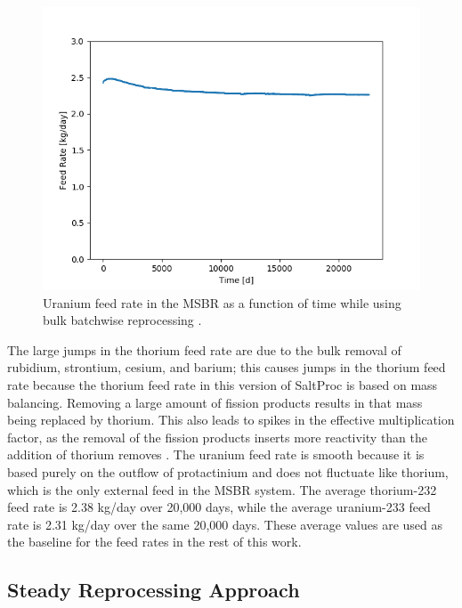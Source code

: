 \begin{figure}[H]
  \centering
  \includegraphics[scale=0.75]{images/Pa233rem_massv01.png}
  \caption{Uranium feed rate in the MSBR as a function of time while using bulk batchwise reprocessing \cite{rykhlevskii_advanced_2018}.}
   \label{fig:U-feed-v1}
\end{figure}

The large jumps in the thorium feed rate are due to the bulk removal of rubidium, strontium, cesium, and barium; this causes jumps in the thorium feed rate because the thorium feed rate in this version of SaltProc is based on mass balancing.
Removing a large amount of fission products results in that mass being replaced by thorium.
This also leads to spikes in the effective multiplication factor, as the removal of the fission products inserts more reactivity than the addition of thorium removes \cite{rykhlevskii_advanced_2018}. The uranium feed rate is smooth because it is based purely on the outflow of protactinium and does not fluctuate like thorium, which is the only external feed in the MSBR system. The average thorium-232 feed rate is 2.38 kg/day over 20,000 days, while the average uranium-233 feed rate is 2.31 kg/day over the same 20,000 days. These average values are used as the baseline for the feed rates in the rest of this work.

\subsection{Steady Reprocessing Approach}
\label{s:steady}

